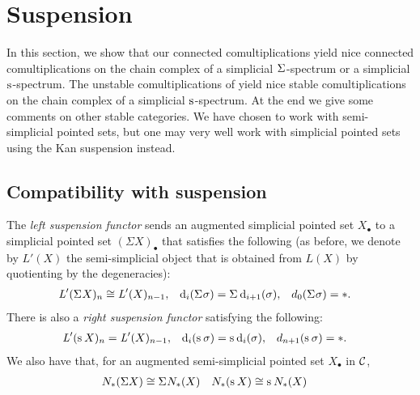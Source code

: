 
\section{Suspension}\label{s:suspension}


In this section, we show that our connected comultiplications yield nice connected comultiplications on the chain complex of a simplicial $\Sigma^{}$-spectrum or a simplicial $\operatorname{s}^{}$-spectrum. The unstable comultiplications of \cite{medina2021may_st} yield nice stable comultiplications on the chain complex of a simplicial $\operatorname{s}^{}$-spectrum. At the end we give some comments on other stable categories. We have chosen to work with semi-simplicial pointed sets, but one may very well work with simplicial pointed sets using the Kan suspension instead.


\subsection{Compatibility with suspension} The \emph{left suspension functor} sends an augmented simplicial pointed set $X_\bullet$ to a simplicial pointed set $(\Sigma X)_\bullet$ that satisfies the following (as before, we denote by $L'(X)$ the semi-simplicial object that is obtained from $L(X)$ by quotienting by the degeneracies):
\begin{align*}
    \operatorname{{\it L}}'(\Sigma^{} X)_n &\cong \operatorname{{\it L}}'(X)_{n-1},& \operatorname{d}_i(\Sigma^{}\sigma) &= \Sigma^{} \operatorname{d}_{i+1}(\sigma),& d_{0}(\Sigma^{}\sigma) &= *.
\end{align*}
There is also a \emph{right suspension functor} satisfying the following:
\begin{align*}
    \operatorname{{\it L}}'(\operatorname{s}^{} X)_n &= \operatorname{{\it L}}'(X)_{n-1}, &\operatorname{d}_i(\operatorname{s}^{}\sigma) &= \operatorname{s}^{} \operatorname{d}_i(\sigma),& d_{n+1}(\operatorname{s}^{} \sigma) &= *.
\end{align*}
We also have that, for an augmented semi-simplicial pointed set $X_\bullet$ in $\mathcal{C}$,
\begin{align*}
    N_{*}(\Sigma X)&\cong \Sigma^{} N_{*}(X) & N_{*}(\operatorname{s}^{}X) &\cong \operatorname{s}^{}N_{*}(X)
\end{align*}

